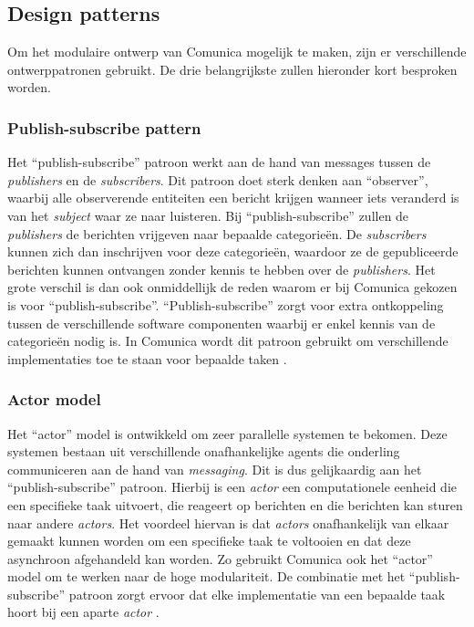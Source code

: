 \subsection{Design patterns}
Om het modulaire ontwerp van Comunica mogelijk te maken, zijn er verschillende ontwerppatronen gebruikt. De drie belangrijkste zullen hieronder kort besproken worden.

\subsubsection{Publish-subscribe pattern}
Het ``publish-subscribe'' patroon werkt aan de hand van messages tussen de \textit{publishers} en de \textit{subscribers}. Dit patroon doet sterk denken aan ``observer'', waarbij alle observerende entiteiten een bericht krijgen wanneer iets veranderd is van het \textit{subject} waar ze naar luisteren. Bij ``publish-subscribe'' zullen de \textit{publishers} de berichten vrijgeven naar bepaalde categorieën. De \textit{subscribers} kunnen zich dan inschrijven voor deze categorieën, waardoor ze de gepubliceerde berichten kunnen ontvangen zonder kennis te hebben over de \textit{publishers}. Het grote verschil is dan ook onmiddellijk de reden waarom er bij Comunica gekozen is voor ``publish-subscribe''. ``Publish-subscribe'' zorgt voor extra ontkoppeling tussen de verschillende software componenten waarbij er enkel kennis van de categorieën nodig is. In Comunica wordt dit patroon gebruikt om verschillende implementaties toe te staan voor bepaalde taken \cite{taelman2018comunica}.

\subsubsection{Actor model}
Het ``actor'' model is ontwikkeld om zeer parallelle systemen te bekomen. Deze systemen bestaan uit verschillende onafhankelijke agents die onderling communiceren aan de hand van \textit{messaging}. Dit is dus gelijkaardig aan het ``publish-subscribe'' patroon. Hierbij is een \textit{actor} een computationele eenheid die een specifieke taak uitvoert, die reageert op berichten en die berichten kan sturen naar andere \textit{actors}. Het voordeel hiervan is dat \textit{actors} onafhankelijk van elkaar gemaakt kunnen worden om een specifieke taak te voltooien en dat deze asynchroon afgehandeld kan worden. Zo gebruikt Comunica ook het ``actor'' model om te werken naar de hoge modulariteit. De combinatie met het ``publish-subscribe'' patroon zorgt ervoor dat elke implementatie van een bepaalde taak hoort bij een aparte \textit{actor} \cite{taelman2018comunica}.

